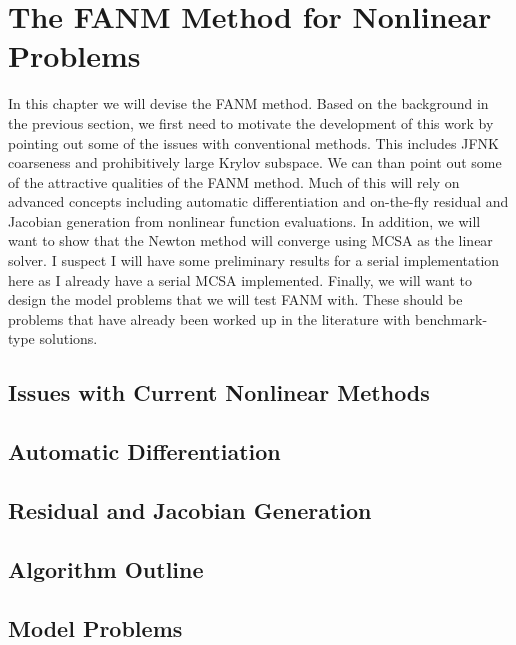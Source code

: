 \chapter{The FANM Method for Nonlinear Problems}
\label{ch:fanm}

In this chapter we will devise the FANM method. Based on the
background in the previous section, we first need to motivate the
development of this work by pointing out some of the issues with
conventional methods. This includes JFNK coarseness and prohibitively
large Krylov subspace. We can than point out some of the attractive
qualities of the FANM method. Much of this will rely on advanced
concepts including automatic differentiation and on-the-fly residual
and Jacobian generation from nonlinear function evaluations. In
addition, we will want to show that the Newton method will converge
using MCSA as the linear solver. I suspect I will have some
preliminary results for a serial implementation here as I already have
a serial MCSA implemented. Finally, we will want to design the model
problems that we will test FANM with. These should be problems that
have already been worked up in the literature with benchmark-type
solutions.

\section{Issues with Current Nonlinear Methods}
\label{sec:nonlinear_issues}

\section{Automatic Differentiation}
\label{sec:automatic_differentiation}

\section{Residual and Jacobian Generation}
\label{sec:fanm_generation}

\section{Algorithm Outline}
\label{sec:fanm_algorithm_outline}

\section{Model Problems}
\label{sec:fanm_model_problems}
